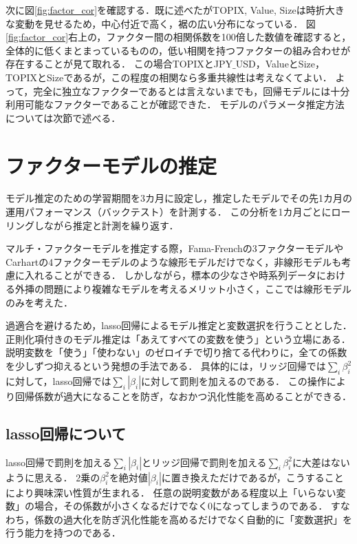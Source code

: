﻿\documentclass[11pt]{jreport}
\begin{document}
次に図\ref{fig:factor_cor}を確認する．既に述べたがTOPIX, Value, Sizeは時折大きな変動を見せるため，中心付近で高く，裾の広い分布になっている．
図\ref{fig:factor_cor}右上の，ファクター間の相関係数を100倍した数値を確認すると，全体的に低くまとまっているものの，低い相関を持つファクターの組み合わせが存在することが見て取れる．
この場合TOPIXとJPY$\_$USD，ValueとSize，TOPIXとSizeであるが，この程度の相関なら多重共線性は考えなくてよい．
よって，完全に独立なファクターであるとは言えないまでも，回帰モデルには十分利用可能なファクターであることが確認できた．
モデルのパラメータ推定方法については次節で述べる．


\section{ファクターモデルの推定}
モデル推定のための学習期間を3カ月に設定し，推定したモデルでその先1カ月の運用パフォーマンス（バックテスト）を計測する．
この分析を1カ月ごとにローリングしながら推定と計測を繰り返す．

マルチ・ファクターモデルを推定する際，Fama-Frenchの3ファクターモデルやCarhartの4ファクターモデルのような線形モデルだけでなく，非線形モデルも考慮に入れることができる．
しかしながら，標本の少なさや時系列データにおける外挿の問題により複雑なモデルを考えるメリット小さく，ここでは線形モデルのみを考えた．


過適合を避けるため，lasso回帰によるモデル推定と変数選択を行うこととした．
正則化項付きのモデル推定は「あえてすべての変数を使う」という立場にある．
説明変数を「使う」「使わない」のゼロイチで切り捨てる代わりに，全ての係数を少しずつ抑えるという発想の手法である．
具体的には，リッジ回帰では$\sum_i\beta_i^2$に対して，lasso回帰では$\sum_i | \beta_i |$に対して罰則を加えるのである．
この操作により回帰係数が過大になることを防ぎ，なおかつ汎化性能を高めることができる．


\subsection{lasso回帰について}
lasso回帰で罰則を加える$\sum_i | \beta_i |$とリッジ回帰で罰則を加える$\sum_i\beta_i^2$に大差はないように思える．
2乗の$\beta_i^2$を絶対値$|\beta_i|$に置き換えただけであるが，こうすることにより興味深い性質が生まれる．
任意の説明変数がある程度以上「いらない変数」の場合，その係数が小さくなるだけでなく$0$になってしまうのである．
すなわち，係数の過大化を防ぎ汎化性能を高めるだけでなく自動的に「変数選択」を行う能力を持つのである．
\end{document}
